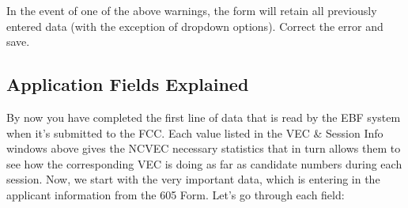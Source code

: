 In the event of one of the above warnings, the form will retain all previously entered data (with the exception of dropdown options). Correct the error and save.

\subsection*{Application Fields Explained}

By now you have completed the first line of data that is read by the E\+BF system when it’s submitted to the F\+CC. Each value listed in the V\+EC \& Session Info windows above gives the N\+C\+V\+EC necessary statistics that in turn allows them to see how the corresponding V\+EC is doing as far as candidate numbers during each session. Now, we start with the very important data, which is entering in the applicant information from the 605 Form. Let’s go through each field\+:


